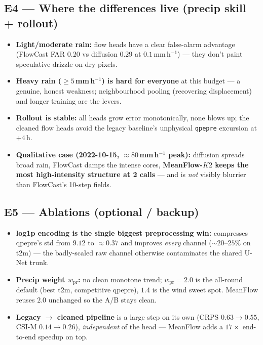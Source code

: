 \documentclass[11pt]{article}
\begin{document}
\subsection*{E4 --- Where the differences live (precip skill + rollout)}
\begin{itemize}
  \item \textbf{Light/moderate rain:} flow heads have a clear false-alarm
        advantage (FlowCast FAR $0.20$ vs diffusion $0.29$ at $0.1$\,mm\,h$^{-1}$)
        --- they don't paint speculative drizzle on dry pixels.
  \item \textbf{Heavy rain ($\geq 5$\,mm\,h$^{-1}$) is hard for everyone} at
        this budget --- a genuine, honest weakness; neighbourhood pooling
        (recovering displacement) and longer training are the levers.
  \item \textbf{Rollout is stable:} all heads grow error monotonically, none
        blows up; the cleaned flow heads avoid the legacy baseline's unphysical
        \texttt{qpepre} excursion at $+4$\,h.
  \item \textbf{Qualitative case (2022-10-15, $\approx 80$\,mm\,h$^{-1}$ peak):}
        diffusion spreads broad rain, FlowCast damps the intense cores,
        \textbf{MeanFlow-$K2$ keeps the most high-intensity structure at 2 calls}
        --- and is \emph{not} visibly blurrier than FlowCast's 10-step fields.
\end{itemize}

\subsection*{E5 --- Ablations (optional / backup)}
\begin{itemize}
  \item \textbf{log1p encoding is the single biggest preprocessing win:}
        compresses qpepre's std from $9.12$ to $\approx 0.37$ and improves
        \emph{every} channel ($\sim 20$--$25\%$ on t2m) --- the badly-scaled raw
        channel otherwise contaminates the shared U-Net trunk.
  \item \textbf{Precip weight $w_{\text{pr}}$:} no clean monotone trend;
        $w_{\text{pr}}{=}2.0$ is the all-round default (best t2m, competitive
        qpepre), $1.4$ is the wind sweet spot. MeanFlow reuses $2.0$ unchanged
        so the A/B stays clean.
  \item \textbf{Legacy $\rightarrow$ cleaned pipeline} is a large step on its
        own (CRPS $0.63{\to}0.55$, CSI-M $0.14{\to}0.26$), \emph{independent} of
        the head --- MeanFlow adds a $17\times$ end-to-end speedup on top.
\end{itemize}
\end{document}
